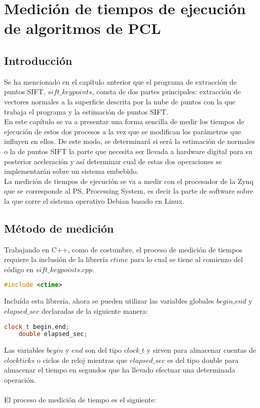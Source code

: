 \chapter{Medición de tiempos de ejecución de algoritmos de PCL}

\section{Introducción}
Se ha mencionado en el capítulo anterior que el programa de extracción de puntos SIFT, $sift\_keypoints$, consta de dos partes principales: extracción de vectores normales a la superficie descrita por la nube de puntos con la que trabaja el programa y la estimación de puntos SIFT.
\\
En este capítulo se va a presentar una forma sencilla de medir los tiempos de ejecución de estos dos procesos a la vez que se modifican los parámetros que influyen en ellos. De este modo, se determinará si será la estimación de normales o la de puntos SIFT la parte que necesita ser llevada a hardware digital para su posterior aceleración y así determinar cual de estas dos operaciones se implementarán sobre un sistema embebido. \\
La medición de tiempos de ejecución se va a medir con el procesador de la Zynq que se corresponde al PS, Processing System, es decir la parte de software sobre la que corre el sistema operativo Debian basado en Linux.
 

\section{Método de medición}
Trabajando en C++, como de costumbre, el proceso de medición de tiempos requiere la inclusión de la librería $ctime$\cite{ctime} para lo cual se tiene al comienzo del código en $sift\_keypoints.cpp$.

\begin{lstlisting}[language=C++,breaklines]
	#include <ctime>
\end{lstlisting}

Incluída esta librería, ahora se pueden utilizar las variables globales $begin$,$end$ y $elapsed\_sec$ declaradas de la siguiente manera:

\begin{lstlisting}[language=C++,breaklines]
	clock_t begin,end;
	double elapsed_sec;
\end{lstlisting}

Las variables $begin$ y $end$ son del tipo $clock\_t$ y sirven para almacenar cuentas de $clock ticks$ o ciclos de reloj mientras que $elapsed\_sec$ es del tipo double para almacenar el tiempo en segundos que ha llevado efectuar una determinada operación.
\\
\\
El proceso de medición de tiempo es el siguiente: 

